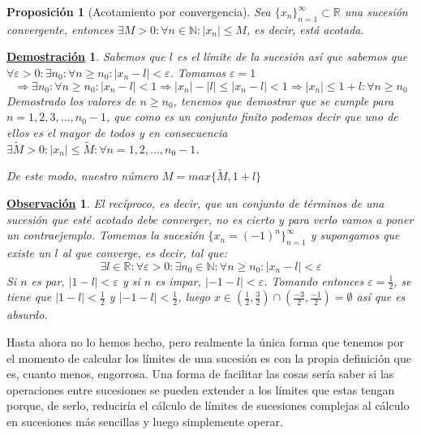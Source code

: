 \documentclass[10pt,a4paper,openright]{book}
\theoremstyle{break}
\newtheorem{prop}{Proposición}[chapter]
\newtheorem*{demo}{\underline{Demostración}}
\newtheorem{obs}{\underline{Observación}}[chapter]
\begin{document}
\begin{prop}[Acotamiento por convergencia]
Sea $\{x_n\}_{n=1}^{\infty}\subset \mathbb R$ una sucesión convergente, entonces $\exists M>0: \forall n\in \mathbb N: |x_n|\leq M$, es decir, está acotada.
\end{prop}
\begin{demo}
Sabemos que $l$ es el límite de la sucesión así que sabemos que $\forall \varepsilon>0: \exists n_0: \forall n\geq n_0: |x_n-l|<\varepsilon$. Tomamos $\varepsilon=1$
$$\Rightarrow \exists n_0: \forall n\geq n_0: |x_n-l|<1\Rightarrow |x_n|-|l|\leq |x_n-l|<1\Rightarrow |x_n|\leq 1+l: \forall n\geq n_0$$
Demostrado los valores de $n\geq n_0$, tenemos que demostrar que se cumple para $n=1,2,3,...,n_0-1$, que como es un conjunto finito podemos decir que uno de ellos es el mayor de todos y en consecuencia $\exists \tilde{M}>0: |x_n|\leq \tilde{M}: \forall n=1,2,..., n_0-1$.\par
De este modo, nuestro número $M=max\{\tilde{M}, 1+l\}$
\end{demo}

\begin{obs}
El recíproco, es decir, que un conjunto de términos de una sucesión que esté acotado debe converger, no es cierto y para verlo vamos a poner un contraejemplo. Tomemos la sucesión $\{x_n=(-1)^n\}_{n=1}^\infty$ y supongamos que existe un $l$ al que converge, es decir, tal que:
\[
\exists l \in \mathbb R: \forall \varepsilon>0: \exists n_0\in \mathbb N: \forall n\geq n_0: |x_n-l|<\varepsilon
\]
Si $n$ es par, $|1-l|<\varepsilon$ y si $n$ es impar, $|-1-l|<\varepsilon$. Tomando entonces $\varepsilon=\frac{1}{2}$, se tiene que $|1-l|<\frac{1}{2}$  y $|-1-l|<\frac{1}{2}$, luego $x\in (\frac{1}{2}, \frac{3}{2})\cap (\frac{-3}{2}, \frac{-1}{2})=\emptyset$ así que es absurdo.
\end{obs}

Hasta ahora no lo hemos hecho, pero realmente la única forma que tenemos por el momento de calcular los límites de una sucesión es con la propia definición que es, cuanto menos, engorrosa. Una forma de facilitar las cosas sería saber si las operaciones entre sucesiones se pueden extender a los límites que estas tengan porque, de serlo, reduciría el cálculo de límites de sucesiones complejas al cálculo en sucesiones más sencillas y luego simplemente operar.
\end{document}
